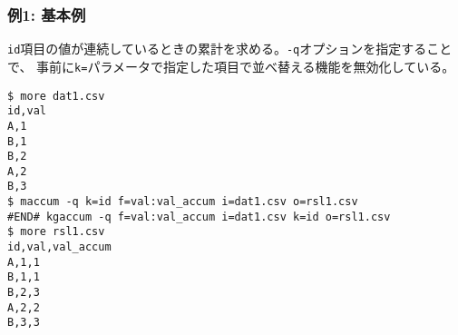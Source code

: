 \subsubsection*{例1: 基本例}

\verb|id|項目の値が連続しているときの累計を求める。\verb|-q|オプションを指定することで、
事前に\verb|k=|パラメータで指定した項目で並べ替える機能を無効化している。


\begin{Verbatim}[baselinestretch=0.7,frame=single]
$ more dat1.csv
id,val
A,1
B,1
B,2
A,2
B,3
$ maccum -q k=id f=val:val_accum i=dat1.csv o=rsl1.csv
#END# kgaccum -q f=val:val_accum i=dat1.csv k=id o=rsl1.csv
$ more rsl1.csv
id,val,val_accum
A,1,1
B,1,1
B,2,3
A,2,2
B,3,3
\end{Verbatim}
